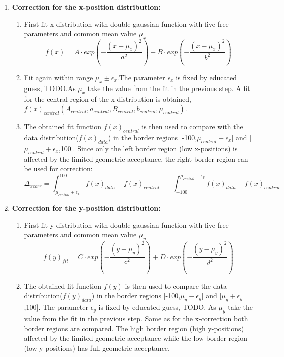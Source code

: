 \begin{enumerate}
\itemsep0em
\item \textbf{Correction for the x-position distribution:}
\begin{enumerate}
\item First fit x-distribution with double-gaussian function with five free parameters and common mean value $\mu_x$
\begin{equation}
f(x) = A \cdot exp\left(-\frac{(x-\mu_x)^2}{a^2} \right) + B \cdot exp\left(-\frac{(x-\mu_x)^2}{b^2} \right)
\end{equation}
\item Fit again within range $\mu_x \pm \epsilon_x$.The parameter $\epsilon_x$ is fixed by educated guess, TODO.As $\mu_x$ take the value from the fit in the previous step. A fit for the central region of the x-distribution is obtained,\newline
$f(x)_{central}(A_{central},a_{central},B_{central},b_{central},\mu_{central})$.
\item The obtained fit function $f(x)_{central}$ is then used to compare with the data distribution($f(x)_{data}$) in the border regions [-100,$\mu_{central}-\epsilon_x$] and [$\mu_{central} + \epsilon_x$,100]. Since only the left border region (low x-positions) is affected by the limited geometric acceptance, the right border region can be used for correction:
\begin{equation}
\Delta_{xcorr} = \int_{\mu_{central} + \epsilon_x}^{100} f(x)_{data} - f(x)_{central}\; - \;\int_{-100}^{\mu_{central} - \epsilon_x} f(x)_{data} - f(x)_{central} 
\end{equation}
\end{enumerate}
\item \textbf{Correction for the y-position distribution:}
\begin{enumerate}
\item First fit y-distribution with double-gaussian function with five free parameters and common mean value $\mu_y$
\begin{equation}
f(y)_{fit} = C \cdot exp\left(-\frac{(y-\mu_y)^2}{c^2} \right) + D \cdot exp\left(-\frac{(y-\mu_y)^2}{d^2} \right)
\end{equation}
\item The obtained fit function $f(y)$ is then used to compare the data distribution($f(y)_{data}$) in the border regions [-100,$\mu_y-\epsilon_y$] and [$\mu_y + \epsilon_y$,100]. The parameter $\epsilon_y$ is fixed by educated guess, TODO. As $\mu_y$ take the value from the fit in the previous step. Same as for the x-correction both border regions are compared. The high border region (high y-positions) affected by the limited geometric acceptance while the low border region (low y-positions) has full geometric acceptance.

\end{enumerate}
\end{enumerate}
